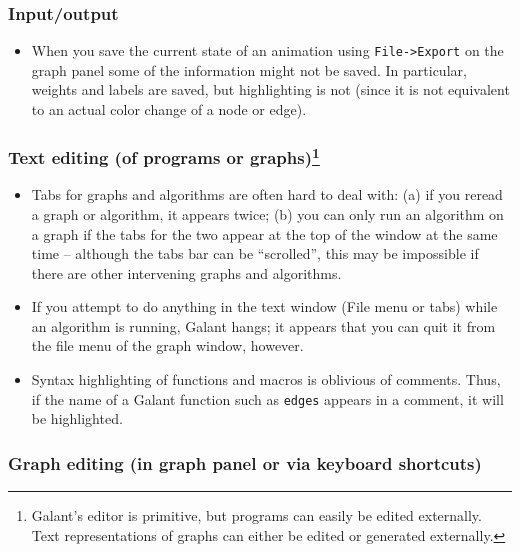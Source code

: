 
\subsubsection*{Input/output}

\begin{itemize}

\item
When you save the current state of an animation using \texttt{File->Export}
on the graph panel some of the information might not be saved.
In particular, weights and labels are saved, but highlighting is not (since it is not equivalent to an actual color change of a node or edge).

\end{itemize}

\subsubsection*{Text editing (of programs or graphs)\footnote{
Galant's editor  is primitive, but
programs can easily be edited externally.
Text representations of graphs can either be edited or generated externally.}}

\begin{itemize}

\item
Tabs for graphs and algorithms are often hard to deal with: (a) if you reread
a graph or algorithm, it appears twice; (b) you can only run an algorithm on a graph if the tabs for the two appear at the top of the window at the same time
-- although the tabs bar can be ``scrolled'',
this may be impossible if there are other intervening graphs and algorithms.

\item If you attempt to do anything in the text window (File menu or tabs)
  while an algorithm is running, Galant hangs; it appears that you can quit it from
the file menu of the graph window, however.

\item
Syntax highlighting of functions and macros is oblivious of comments.
Thus, if the name of a Galant function such as \texttt{edges} appears in a comment,
it will be highlighted.

\end{itemize}

\subsubsection*{Graph editing (in graph panel or via keyboard shortcuts)}

